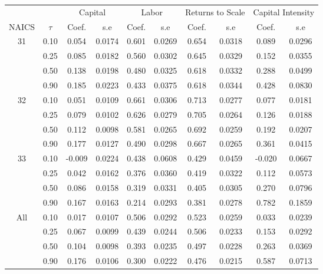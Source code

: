 \begin{table}[H]
\centering
\begin{tabular}{cccccccccc}
  \hline\hline & & \multicolumn{2}{c}{Capital}  & \multicolumn{2}{c}{Labor} & \multicolumn{2}{c}{Returns to Scale} & \multicolumn{2}{c}{Capital Intensity}\\ \cmidrule(lr){3-4} \cmidrule(lr){5-6} \cmidrule(lr){7-8} \cmidrule(lr){9-10}NAICS & $\tau$ & Coef. & s.e & Coef. & s.e & Coef. & s.e & Coef. & s.e \\ 
  \hline
31 & 0.10 & 0.054 & 0.0174 & 0.601 & 0.0269 & 0.654 & 0.0318 & 0.089 & 0.0296 \\ 
   & 0.25 & 0.085 & 0.0182 & 0.560 & 0.0302 & 0.645 & 0.0329 & 0.152 & 0.0355 \\ 
   & 0.50 & 0.138 & 0.0198 & 0.480 & 0.0325 & 0.618 & 0.0332 & 0.288 & 0.0499 \\ 
   & 0.90 & 0.185 & 0.0223 & 0.433 & 0.0375 & 0.618 & 0.0344 & 0.428 & 0.0830 \\ 
  32 & 0.10 & 0.051 & 0.0109 & 0.661 & 0.0306 & 0.713 & 0.0277 & 0.077 & 0.0181 \\ 
   & 0.25 & 0.079 & 0.0102 & 0.626 & 0.0279 & 0.705 & 0.0264 & 0.126 & 0.0188 \\ 
   & 0.50 & 0.112 & 0.0098 & 0.581 & 0.0265 & 0.692 & 0.0259 & 0.192 & 0.0207 \\ 
   & 0.90 & 0.177 & 0.0127 & 0.490 & 0.0298 & 0.667 & 0.0265 & 0.361 & 0.0415 \\ 
  33 & 0.10 & -0.009 & 0.0224 & 0.438 & 0.0608 & 0.429 & 0.0459 & -0.020 & 0.0667 \\ 
   & 0.25 & 0.042 & 0.0162 & 0.376 & 0.0360 & 0.419 & 0.0322 & 0.112 & 0.0573 \\ 
   & 0.50 & 0.086 & 0.0158 & 0.319 & 0.0331 & 0.405 & 0.0305 & 0.270 & 0.0796 \\ 
   & 0.90 & 0.167 & 0.0163 & 0.214 & 0.0293 & 0.381 & 0.0278 & 0.782 & 0.1859 \\ 
  All & 0.10 & 0.017 & 0.0107 & 0.506 & 0.0292 & 0.523 & 0.0259 & 0.033 & 0.0239 \\ 
   & 0.25 & 0.067 & 0.0099 & 0.439 & 0.0244 & 0.506 & 0.0233 & 0.153 & 0.0292 \\ 
   & 0.50 & 0.104 & 0.0098 & 0.393 & 0.0235 & 0.497 & 0.0228 & 0.263 & 0.0369 \\ 
   & 0.90 & 0.176 & 0.0106 & 0.300 & 0.0222 & 0.476 & 0.0215 & 0.587 & 0.0713 \\ 
   \hline
\end{tabular}
\end{table}
